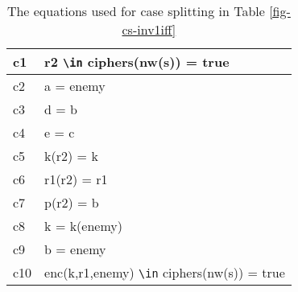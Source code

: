\documentclass[a4paper,fleqn]{cas-dc}
\begin{document}
\begin{table}[]
	\begin{tabular}{l|l}
		\hline
		c1           &  r2 \verb!\in! ciphers(nw(s)) = true                                               \\ \hline
		c2         &   a = enemy                                                    \\ \hline
		c3         &    d = b                                                   \\ \hline
		c4 & e = c
		\\ \hline
		c5 & k(r2) = k
		\\ \hline
		c6   & r1(r2) = r1
		\\ \hline
		c7     & p(r2) = b
		\\ \hline
		c8       &   k = k(enemy)                                
		\\ \hline
		c9      & b = enemy
		
	\\ \hline
		
	    c10 &  enc(k,r1,enemy) \verb!\in! ciphers(nw(s)) = true
	    \\ \hline
	\end{tabular}
\caption{The equations used for case splitting in Table \ref{fig-cs-inv1iff}}
\label{fig-inv1iff}
\end{table}
\end{document}
